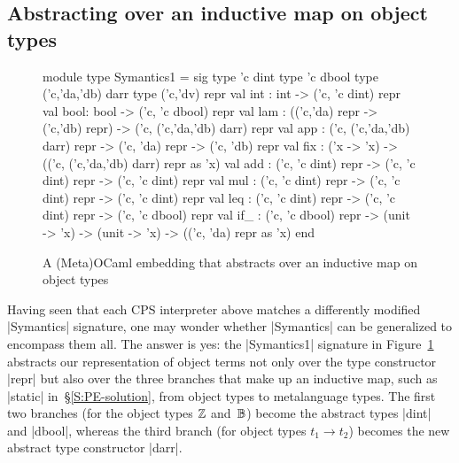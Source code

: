 \subsection{Abstracting over an inductive map on object types}

\begin{figure}[t]
\begin{floatrule}
\begin{code}
module type Symantics1 = sig
  type 'c dint
  type 'c dbool
  type ('c,'da,'db) darr
  type ('c,'dv) repr
  val int : int  -> ('c, 'c dint) repr
  val bool: bool -> ('c, 'c dbool) repr
  val lam : (('c,'da) repr -> ('c,'db) repr) -> ('c, ('c,'da,'db) darr) repr
  val app : ('c, ('c,'da,'db) darr) repr -> ('c, 'da) repr -> ('c, 'db) repr
  val fix : ('x -> 'x) -> (('c, ('c,'da,'db) darr) repr as 'x)
  val add : ('c, 'c dint) repr -> ('c, 'c dint) repr -> ('c, 'c dint) repr
  val mul : ('c, 'c dint) repr -> ('c, 'c dint) repr -> ('c, 'c dint) repr
  val leq : ('c, 'c dint) repr -> ('c, 'c dint) repr -> ('c, 'c dbool) repr
  val if_ : ('c, 'c dbool) repr
            -> (unit -> 'x) -> (unit -> 'x) -> (('c, 'da) repr as 'x)
end
\end{code}
\end{floatrule}
\caption{A (Meta)OCaml embedding that abstracts over an inductive map on object types}
\label{fig:inductive}
\end{figure}

Having seen that each CPS interpreter above matches a differently
modified |Symantics| signature, one may wonder whether |Symantics|
can be generalized to encompass them all.  The answer is yes: the
|Symantics1| signature in Figure~\ref{fig:inductive} abstracts our
representation of object terms not only over the type constructor
|repr| but also over the three branches that make up an inductive
map, such as |static| in~\S\ref{S:PE-solution}, from object types
to metalanguage types.  The first two branches (for the object
types $\mathbb{Z}$ and~$\mathbb{B}$) become the abstract types |dint| and
|dbool|, whereas the third branch (for object types $t_1\to t_2$)
becomes the new abstract type constructor |darr|.


